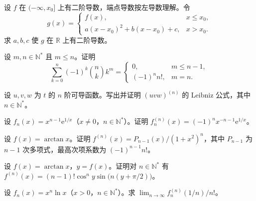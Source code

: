 \noindent\begin{minipage}{\textwidth}
设 $f$ 在 $(-\infty,x_0]$ 上有二阶导数，端点导数按左导数理解。令\[g(x)=\begin{cases}f(x),&x\le x_0,\\a(x-x_0)^2+b(x-x_0)+c,&x>x_0.\end{cases}\]求 $a,b,c$ 使 $g$ 在 $\mathbb R$ 上有二阶导数。
\end{minipage}\par\vfill
\newpage
\noindent\begin{minipage}{\textwidth}
设 $m,n\in\mathbb N^*$ 且 $m\le n$。证明\[\sum_{k=0}^n(-1)^k\binom nk k^m=\begin{cases}0,&m\le n-1,\\(-1)^n n!,&m=n.\end{cases}\]
\end{minipage}\par\vfill
\noindent\begin{minipage}{\textwidth}
设 $u,v,w$ 为 $t$ 的 $n$ 阶可导函数。写出并证明 $(uvw)^{(n)}$ 的 Leibniz 公式，其中 $n\in\mathbb N^*$。
\end{minipage}\par\vfill
\noindent\begin{minipage}{\textwidth}
设 $f_n(x)=x^{n-1}\mathrm e^{1/x}$（$x\ne0$，$n\in\mathbb N^*$）。证明 $f_n^{(n)}(x)=(-1)^n x^{-n-1}\mathrm e^{1/x}$。
\end{minipage}\par\vfill
\newpage
\noindent\begin{minipage}{\textwidth}
设 $f(x)=\arctan x$。证明 $f^{(n)}(x)=P_{n-1}(x)/(1+x^2)^n$，其中 $P_{n-1}$ 为 $n-1$ 次多项式，最高次项系数为 $(-1)^{n-1}n!$。
\end{minipage}\par\vfill
\noindent\begin{minipage}{\textwidth}
设 $f(x)=\arctan x$，$y=f(x)$。证明对 $n\in\mathbb N^*$ 有 $f^{(n)}(x)=(n-1)!\cos^ny\sin\bigl(n(y+\pi/2)\bigr)$。
\end{minipage}\par\vfill
\noindent\begin{minipage}{\textwidth}
设 $f_n(x)=x^n\ln x$（$x>0$，$n\in\mathbb N^*$）。求 $\lim_{n\to\infty}f_n^{(n)}(1/n)/n!$。
\end{minipage}\par\vfill
